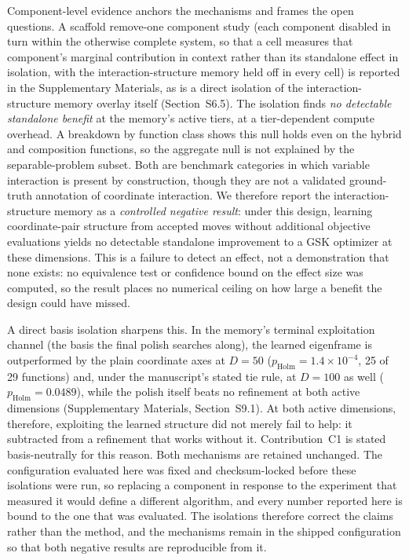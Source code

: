 \documentclass[10pt,a4paper]{article}
\begin{document}
Component-level evidence anchors the mechanisms and frames the open
questions. A scaffold remove-one
component study (each component disabled in turn within the otherwise
complete system, so that a cell measures that component's marginal
contribution in context rather than its standalone effect in isolation, with the
interaction-structure memory held off in
every cell) is reported in the Supplementary Materials, as is a
direct isolation of the interaction-structure memory overlay itself
(Section~S6.5). The isolation finds \emph{no detectable standalone
benefit} at the memory's active tiers, at a tier-dependent compute overhead.
A breakdown by function class shows this null holds even on the hybrid
and composition functions, so the aggregate null is not explained by the
separable-problem subset. Both are benchmark categories in which variable
interaction is present by construction, though they are not a validated
ground-truth annotation of coordinate interaction. We
therefore report the interaction-structure memory as a \emph{controlled
negative result}: under this design, learning coordinate-pair structure from accepted
moves without additional objective evaluations yields no detectable standalone
improvement to a GSK optimizer at these
dimensions. This is a failure to detect an effect, not a demonstration that
none exists: no equivalence test or confidence bound on the effect size was
computed, so the result places no numerical ceiling on how large a benefit the
design could have missed.

A direct basis isolation sharpens this. In the
memory's terminal exploitation channel (the basis the final polish searches
along), the learned eigenframe is outperformed by the plain coordinate axes at
$D = 50$ ($p_{\mathrm{Holm}} = 1.4\times10^{-4}$, 25 of 29 functions) and, under
the manuscript's stated tie rule, at $D = 100$ as well
($p_{\mathrm{Holm}} = 0.0489$), while the
polish itself beats no refinement at both active dimensions (Supplementary
Materials, Section~S9.1). At both active dimensions, therefore,
exploiting the learned structure did not merely fail to help: it subtracted from
a refinement that works without it. Contribution~C1 is stated basis-neutrally
for this reason.
Both mechanisms are retained unchanged. The configuration evaluated here was
fixed and checksum-locked before these isolations were run, so replacing a
component in response to the experiment that measured it would define a
different algorithm, and every number reported here is bound to the one that
was evaluated. The isolations therefore correct the claims rather than the
method, and the mechanisms remain in the shipped configuration so that both
negative results are reproducible from it.
\end{document}
